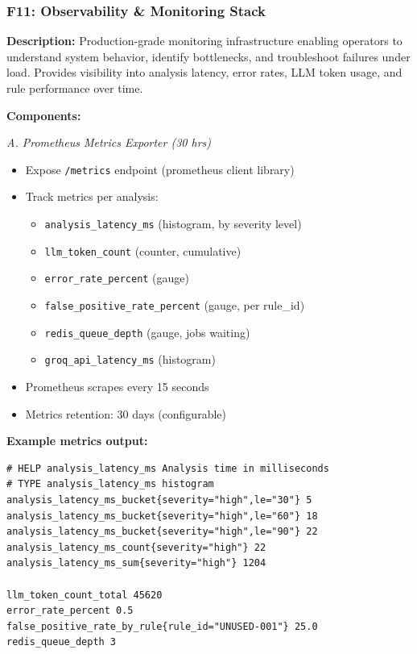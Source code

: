 \documentclass[11pt,a4paper]{article}
\begin{document}
\subsubsection{F11: Observability \& Monitoring Stack}
\textbf{Description:} Production-grade monitoring infrastructure enabling operators to understand system behavior, identify bottlenecks, and troubleshoot failures under load. Provides visibility into analysis latency, error rates, LLM token usage, and rule performance over time.

\textbf{Components:}

\textit{A. Prometheus Metrics Exporter (30 hrs)}
\begin{itemize}[leftmargin=*]
    \item Expose \texttt{/metrics} endpoint (prometheus client library)
    \item Track metrics per analysis:
    \begin{itemize}
        \item \texttt{analysis\_latency\_ms} (histogram, by severity level)
        \item \texttt{llm\_token\_count} (counter, cumulative)
        \item \texttt{error\_rate\_percent} (gauge)
        \item \texttt{false\_positive\_rate\_percent} (gauge, per rule\_id)
        \item \texttt{redis\_queue\_depth} (gauge, jobs waiting)
        \item \texttt{groq\_api\_latency\_ms} (histogram)
    \end{itemize}
    \item Prometheus scrapes every 15 seconds
    \item Metrics retention: 30 days (configurable)
\end{itemize}

\textbf{Example metrics output:}
\begin{verbatim}
# HELP analysis_latency_ms Analysis time in milliseconds
# TYPE analysis_latency_ms histogram
analysis_latency_ms_bucket{severity="high",le="30"} 5
analysis_latency_ms_bucket{severity="high",le="60"} 18
analysis_latency_ms_bucket{severity="high",le="90"} 22
analysis_latency_ms_count{severity="high"} 22
analysis_latency_ms_sum{severity="high"} 1204

llm_token_count_total 45620
error_rate_percent 0.5
false_positive_rate_by_rule{rule_id="UNUSED-001"} 25.0
redis_queue_depth 3
\end{verbatim}
\end{document}
